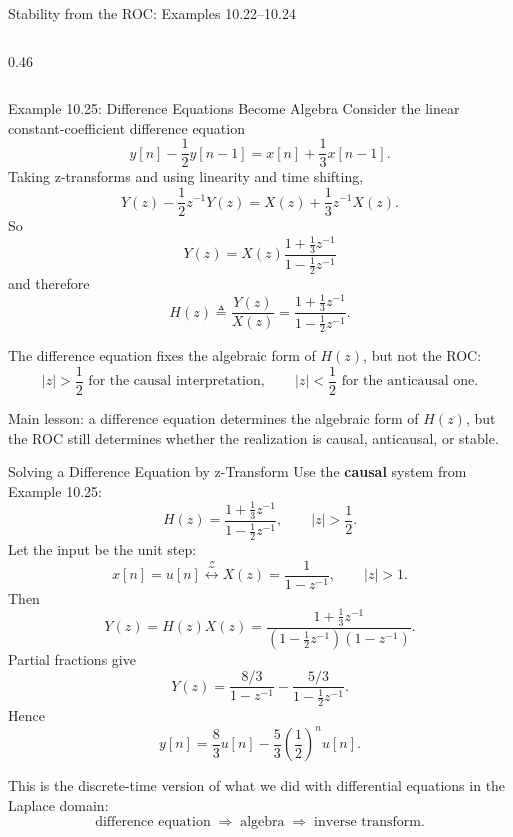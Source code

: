 \begin{frame}[t]{Stability from the ROC: Examples 10.22--10.24}
\begin{columns}[T]
\begin{column}{0.46\textwidth}
\begin{center}
      \end{center}
    \end{column}
  \end{columns}
\end{frame}

\begin{frame}[t]{Example 10.25: Difference Equations Become Algebra}
  \small
  Consider the linear constant-coefficient difference equation
  \[
    y[n]-\frac12 y[n-1] = x[n]+\frac13 x[n-1].
  \]
  Taking z-transforms and using linearity and time shifting,
  \[
    Y(z)-\frac12 z^{-1}Y(z)=X(z)+\frac13 z^{-1}X(z).
  \]
  So
  \[
    Y(z)=X(z)\frac{1+\frac13 z^{-1}}{1-\frac12 z^{-1}}
  \]
  and therefore
  \[
    H(z)\triangleq \frac{Y(z)}{X(z)}
    =
    \frac{1+\frac13 z^{-1}}{1-\frac12 z^{-1}}.
  \]

  The difference equation fixes the algebraic form of $H(z)$, but not the ROC:
  \[
    |z|>\frac12 \text{ for the causal interpretation},
    \qquad
    |z|<\frac12 \text{ for the anticausal one}.
  \]

  \vspace{0.08cm}
  Main lesson:
  a difference equation determines the algebraic form of $H(z)$, but the ROC still determines whether the realization is causal, anticausal, or stable.
\end{frame}

\begin{frame}[t]{Solving a Difference Equation by z-Transform}
  \small
  Use the \textbf{causal} system from Example 10.25:
  \[
    H(z)=\frac{1+\frac13 z^{-1}}{1-\frac12 z^{-1}},
    \qquad |z|>\frac12.
  \]
  Let the input be the unit step:
  \[
    x[n]=u[n]
    \stackrel{\mathcal{Z}}{\longleftrightarrow}
    X(z)=\frac{1}{1-z^{-1}},
    \qquad |z|>1.
  \]
  Then
  \[
    Y(z)=H(z)X(z)
    =
    \frac{1+\frac13 z^{-1}}
    {\left(1-\frac12 z^{-1}\right)\left(1-z^{-1}\right)}.
  \]
  Partial fractions give
  \[
    Y(z)=\frac{8/3}{1-z^{-1}}-\frac{5/3}{1-\frac12 z^{-1}}.
  \]
  Hence
  \[
    y[n]=\frac{8}{3}u[n]-\frac{5}{3}\left(\frac12\right)^n u[n].
  \]

  \vspace{0.08cm}
  This is the discrete-time version of what we did with differential equations in the Laplace domain:
  \[
    \text{difference equation} \;\Longrightarrow\; \text{algebra} \;\Longrightarrow\; \text{inverse transform}.
  \]
\end{frame}


